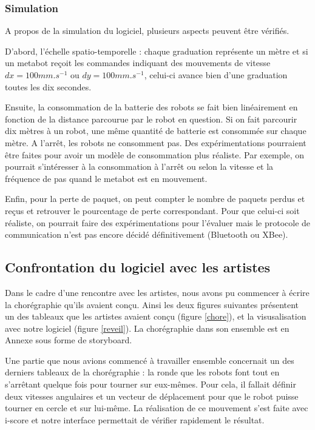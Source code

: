 \subsubsection{Simulation}

A propos de la simulation du logiciel, plusieurs aspects peuvent être vérifiés.

D'abord, l'échelle spatio-temporelle : chaque graduation représente un mètre et si un metabot reçoit les commandes indiquant des mouvements de vitesse $dx=100 mm.s^{-1}$ ou $dy=100 mm.s^{-1}$, celui-ci avance bien d'une graduation toutes les dix secondes.

Ensuite, la consommation de la batterie des robots se fait bien linéairement en fonction de la distance parcourue par le robot en question. Si on fait parcourir dix mètres à un robot, une même quantité de batterie est consommée sur chaque mètre. A l'arrêt, les robots ne consomment pas. Des expérimentations pourraient être faites pour avoir un modèle de consommation plus réaliste. Par exemple, on pourrait s'intéresser à la consommation à l'arrêt ou selon la vitesse et la fréquence de pas quand le metabot est en mouvement.

Enfin, pour la perte de paquet, on peut compter le nombre de paquets perdus et reçus et retrouver le pourcentage de perte correspondant. Pour que celui-ci soit réaliste, on pourrait faire des expérimentations pour l'évaluer mais le protocole de communication n'est pas encore décidé définitivement (Bluetooth ou XBee). 

\subsection{Confrontation du logiciel avec les artistes}

Dans le cadre d'une rencontre avec les artistes, nous avons pu commencer à écrire la chorégraphie qu'ils avaient conçu. Ainsi les deux figures suivantes présentent un des tableaux que les artistes avaient conçu (figure \ref{chore}), et la visusalisation avec notre logiciel (figure \ref{reveil}). La chorégraphie dans son ensemble est en Annexe sous forme de storyboard. 

Une partie que nous avions commencé à travailler ensemble concernait un des derniers tableaux de la chorégraphie : la ronde que les robots font tout en s'arrêtant quelque fois pour tourner sur eux-mêmes. Pour cela, il fallait définir deux vitesses angulaires et un vecteur de déplacement pour que le robot puisse tourner en cercle et sur lui-même. La réalisation de ce mouvement s'est faite avec i-score et notre interface permettait de vérifier rapidement le résultat.

